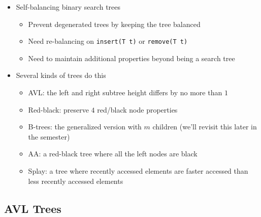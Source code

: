 \documentclass[
  10pt,
  english,
  letterpaper,
,tablecaptionabove
]{scrartcl}
\newcommand{\passthrough}[1]{#1}
\providecommand{\tightlist}{%
  \setlength{\itemsep}{0pt}\setlength{\parskip}{0pt}}
\begin{document}
\begin{itemize}
\tightlist
\item
  Self-balancing binary search trees

  \begin{itemize}
  \tightlist
  \item
    Prevent degenerated trees by keeping the tree balanced
  \item
    Need re-balancing on \passthrough{\lstinline!insert(T t)!} or
    \passthrough{\lstinline!remove(T t)!}
  \item
    Need to maintain additional properties beyond being a search tree
  \end{itemize}
\item
  Several kinds of trees do this

  \begin{itemize}
  \tightlist
  \item
    AVL: the left and right subtree height differs by no more than \(1\)
  \item
    Red-black: preserve \(4\) red/black node properties
  \item
    B-trees: the generalized version with \(m\) children (we'll revisit
    this later in the semester)
  \item
    AA: a red-black tree where all the left nodes are black
  \item
    Splay: a tree where recently accessed elements are faster accessed
    than less recently accessed elements
  \end{itemize}
\end{itemize}

\hypertarget{avl-trees}{%
\subsection{AVL Trees}\label{avl-trees}}
\end{document}

